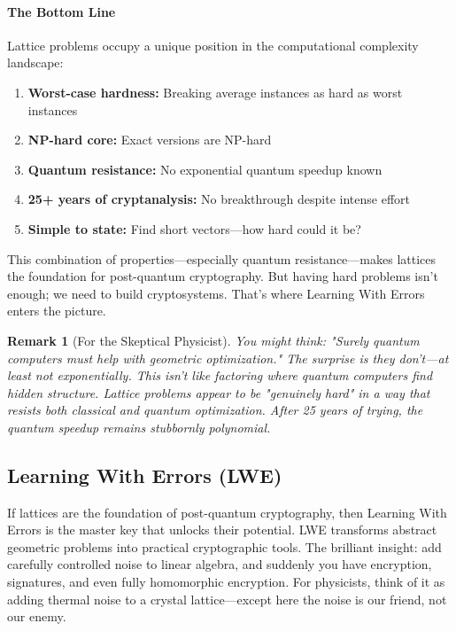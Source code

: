 \documentclass[11pt,a4paper]{article}
\newtheorem{remark}{Remark}
\begin{document}
\paragraph{The Bottom Line}

Lattice problems occupy a unique position in the computational complexity landscape:

\begin{enumerate}
    \item \textbf{Worst-case hardness:} Breaking average instances as hard as worst instances
    \item \textbf{NP-hard core:} Exact versions are NP-hard
    \item \textbf{Quantum resistance:} No exponential quantum speedup known
    \item \textbf{25+ years of cryptanalysis:} No breakthrough despite intense effort
    \item \textbf{Simple to state:} Find short vectors—how hard could it be?
\end{enumerate}

This combination of properties—especially quantum resistance—makes lattices the foundation for post-quantum cryptography. But having hard problems isn't enough; we need to build cryptosystems. That's where Learning With Errors enters the picture.

\begin{remark}[For the Skeptical Physicist]
You might think: "Surely quantum computers must help with geometric optimization." The surprise is they don't—at least not exponentially. This isn't like factoring where quantum computers find hidden structure. Lattice problems appear to be "genuinely hard" in a way that resists both classical and quantum optimization. After 25 years of trying, the quantum speedup remains stubbornly polynomial.
\end{remark}

\subsection{Learning With Errors (LWE)}
\label{sec:lwe}

If lattices are the foundation of post-quantum cryptography, then Learning With Errors is the master key that unlocks their potential. LWE transforms abstract geometric problems into practical cryptographic tools. The brilliant insight: add carefully controlled noise to linear algebra, and suddenly you have encryption, signatures, and even fully homomorphic encryption. For physicists, think of it as adding thermal noise to a crystal lattice—except here the noise is our friend, not our enemy.
\end{document}
